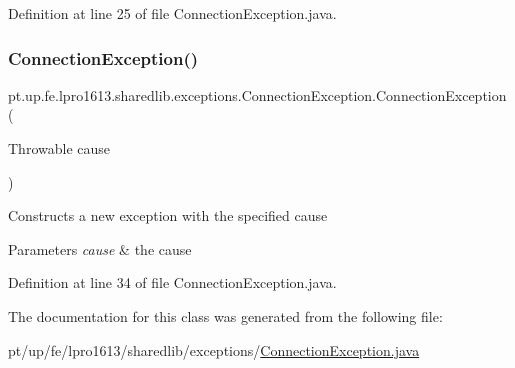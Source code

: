 Definition at line 25 of file Connection\+Exception.\+java.

\hypertarget{classpt_1_1up_1_1fe_1_1lpro1613_1_1sharedlib_1_1exceptions_1_1_connection_exception_a78daf9e69ac5d62dfc64bca6da1115a7}{}\label{classpt_1_1up_1_1fe_1_1lpro1613_1_1sharedlib_1_1exceptions_1_1_connection_exception_a78daf9e69ac5d62dfc64bca6da1115a7} 
\subsubsection{\texorpdfstring{Connection\+Exception()}{ConnectionException()}\hspace{0.1cm}{\footnotesize\ttfamily [3/3]}}
{\footnotesize\ttfamily pt.\+up.\+fe.\+lpro1613.\+sharedlib.\+exceptions.\+Connection\+Exception.\+Connection\+Exception (\begin{DoxyParamCaption}\item[{Throwable}]{cause }\end{DoxyParamCaption})}

Constructs a new exception with the specified cause


\begin{DoxyParams}{Parameters}
{\em cause} & the cause \\
\hline
\end{DoxyParams}


Definition at line 34 of file Connection\+Exception.\+java.



The documentation for this class was generated from the following file\+:\begin{DoxyCompactItemize}
\item 
pt/up/fe/lpro1613/sharedlib/exceptions/\hyperlink{_connection_exception_8java}{Connection\+Exception.\+java}\end{DoxyCompactItemize}
